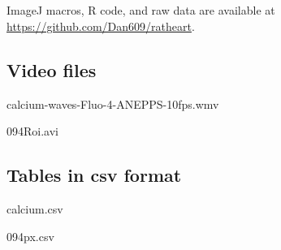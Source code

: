 \documentclass{biophys-new}
\begin{document}
\subsection*{}\label{github}

ImageJ macros, R code, and raw data are available at \url{https://github.com/Dan609/ratheart}.

\subsection*{Video files}

calcium-waves-Fluo-4-ANEPPS-10fps.wmv

094Roi.avi

\subsection*{Tables in csv format}

calcium.csv

094px.csv

\end{document}
